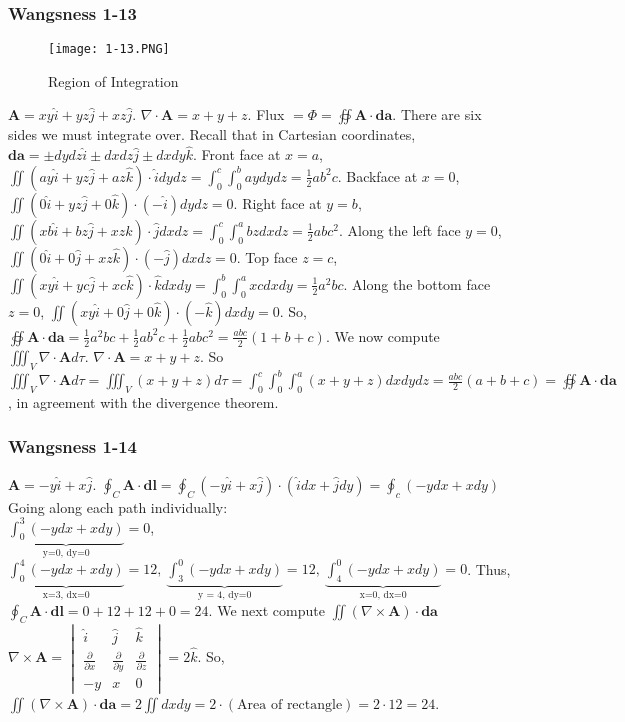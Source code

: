 \documentclass[oneside]{book}
\theoremstyle{definition}
\newcommand*\B[1]{\mathbf{#1}}
\begin{document}
\subsubsection{Wangsness 1-13}

\begin{figure}[htbp]
\begin{center}
\texttt{[image: 1-13.PNG]}
\caption{Region of Integration}
\label{default}
\end{center}
\end{figure}

$\B{A}= xy\hat{i} + yz\hat{j} + xz\hat{j}$. $\nabla \cdot \B{A} = x+y+z$. Flux $= \Phi = \oiint \B{A}\cdot \B{da}$. There are six sides we must integrate over. Recall that in Cartesian coordinates, $\B{da} = \pm dydz \hat{i} \pm dxdz\hat{j} \pm dxdy\hat{k}$. Front face at $x=a$, $\iint(ay\hat{i}+yz\hat{j}+az\hat{k})\cdot \hat{i}dydz = \int_{0}^{c}\int_{0}^{b}aydydz = \frac{1}{2}ab^2c$. Backface at $x=0$, $\iint(0\hat{i}+yz\hat{j}+0\hat{k})\cdot (-\hat{i})dydz = 0$. Right face at $y=b$, $\iint(xb\hat{i}+bz\hat{j}+xz\hat{k})\cdot\hat{j}dxdz = \int_{0}^{c}\int_{0}^{a} bz dxdz = \frac{1}{2}ab c^2$. Along the left face $y=0$, $\iint(0\hat{i}+0\hat{j}+xz\hat{k})\cdot (-\hat{j})dxdz = 0$. Top face $z=c$, $\iint(xy\hat{i}+yc\hat{j}+xc \hat{k})\cdot \hat{k}dxdy = \int_{0}^{b}\int_{0}^{a} xcdxdy = \frac{1}{2}a^2bc$. Along the bottom face $z=0$, $\iint(xy\hat{i}+0\hat{j}+0\hat{k})\cdot (-\hat{k})dxdy = 0$. So, $\oiint \B{A}\cdot \B{da} = \frac{1}{2} a^2bc + \frac{1}{2}ab^2c + \frac{1}{2}abc^2 = \frac{abc}{2}(1+b+c)$. We now compute $\iiint_V \nabla \cdot \B{A} d\tau$. $\nabla \cdot \B{A} = x+y+z$. So $\iiint_V \nabla \cdot \B{A} d\tau = \iiint_V (x+y+z)d\tau = \int_{0}^{c}\int_{0}^{b}\int_{0}^{a}(x+y+z)dxdydz = \frac{abc}{2}(a+b+c) = \oiint \B{A}\cdot \B{da}$, in agreement with the divergence theorem.

\subsubsection{Wangsness 1-14}

$\B{A} = -y\hat{i}+x\hat{j}$. $\oint_C \B{A}\cdot \B{dl} = \oint_{C} (-y\hat{i}+x\hat{j})\cdot(\hat{i}dx+\hat{j}dy) = \oint_{c}(-ydx+xdy)$ Going along each path individually: \\
$\underbrace{\int_{0}^{3} (-ydx+xdy)}_\text{y=0,\ dy=0} = 0$, $\underbrace{\int_{0}^{4}(-ydx+xdy)}_\text{x=3,\ dx=0} = 12,\ \underbrace{\int_{3}^{0}(-ydx+xdy)}_\text{y = 4,\ dy=0}= 12,\ \underbrace{\int_{4}^{0}(-ydx+xdy)}_\text{x=0,\ dx=0} = 0$. Thus, $\oint_{C} \B{A}\cdot \B{dl} = 0+12+12+0 = 24$. We next compute $\iint (\nabla\times \B{A})\cdot \B{da}$\\ $\nabla \times \B{A} = \begin{vmatrix} \hat{i} & \hat{j} & \hat{k} \\ \frac{\partial}{\partial x} & \frac{\partial}{\partial y} & \frac{\partial}{\partial z} \\ -y & x & 0 \end{vmatrix} = 2\hat{k}$. So, $\iint (\nabla\times \B{A}) \cdot \B{da} = 2\iint dxdy = 2 \cdot(\textrm{Area of rectangle}) = 2\cdot 12 = 24$. 
\end{document}
